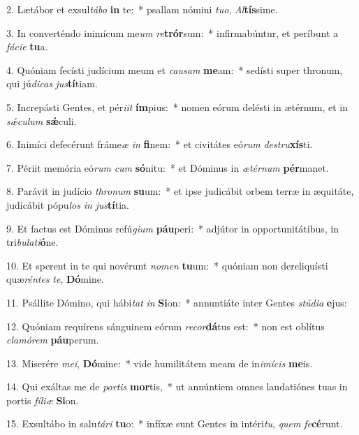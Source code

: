 2. Lætábor et exsul\textit{tá}\textit{bo} \textbf{in} te:~*  psallam nómini \textit{tu}\textit{o}, \textit{Al}\textbf{tís}sime.\

3. In converténdo inimícum me\textit{um} \textit{re}\textbf{trór}sum:~*  infirmabúntur, et períbunt a \textit{fá}\textit{ci}\textit{e} \textbf{tu}a.\

4. Quóniam fecísti judícium meum et \textit{cau}\textit{sam} \textbf{me}am:~*  sedísti super thronum, qui jú\textit{di}\textit{cas} \textit{jus}\textbf{tí}tiam.\

5. Increpásti Gentes, et pér\textit{i}\textit{it} \textbf{ím}pius:~*  nomen eórum delésti in ætérnum, et in \textit{sǽ}\textit{cu}\textit{lum} \textbf{sǽ}culi.\

6. Inimíci defecérunt fráme\textit{æ} \textit{in} \textbf{fi}nem:~*  et civitátes eó\textit{rum} \textit{de}\textit{stru}\textbf{xís}ti.\

7. Périit memória eó\textit{rum} \textit{cum} \textbf{só}nitu:~*  et Dóminus in \textit{æ}\textit{tér}\textit{num} \textbf{pér}manet.\

8. Parávit in judício \textit{thro}\textit{num} \textbf{su}um:~*  et ipse judicábit orbem terræ in æquitáte, judicábit pópu\textit{los} \textit{in} \textit{jus}\textbf{tí}tia.\

9. Et factus est Dóminus refú\textit{gi}\textit{um} \textbf{páu}peri:~*  adjútor in opportunitátibus, in tri\textit{bu}\textit{la}\textit{ti}\textbf{ó}ne.\

10. Et sperent in te qui novérunt \textit{no}\textit{men} \textbf{tu}um:~*  quóniam non dereliquísti quæ\textit{rén}\textit{tes} \textit{te}, \textbf{Dó}mine.\

11. Psállite Dómino, qui hábi\textit{tat} \textit{in} \textbf{Si}on:~*  annuntiáte inter Gentes \textit{stú}\textit{di}\textit{a} \textbf{e}jus:\

12. Quóniam requírens sánguinem eórum \textit{re}\textit{cor}\textbf{dá}tus est:~*  non est oblítus \textit{cla}\textit{mó}\textit{rem} \textbf{páu}perum.\

13. Miserére \textit{me}\textit{i}, \textbf{Dó}mine:~*  vide humilitátem meam de in\textit{i}\textit{mí}\textit{cis} \textbf{me}is.\

14. Qui exáltas me de \textit{por}\textit{tis} \textbf{mor}tis,~*  ut annúntiem omnes laudatiónes tuas in portis \textit{fí}\textit{li}\textit{æ} \textbf{Si}on.\

15. Exsultábo in salu\textit{tá}\textit{ri} \textbf{tu}o:~*  infíxæ sunt Gentes in intéri\textit{tu}, \textit{quem} \textit{fe}\textbf{cé}runt.\

